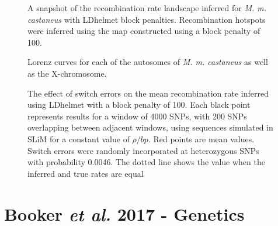  \begin{figure}
   \centering      
   \noindent{}
 \caption[A snapshot of the recombination landscape for genomic region containing the PRDM9 gene]{A snapshot of the recombination rate landscape inferred for \textit{M. m. castaneus} with LDhelmet block penalties. Recombination hotspots were inferred using the map constructed using a block penalty of 100.}
 \label{fig:S4}
\end{figure}
 
 
 \begin{figure}
   \centering      
   \noindent{}
 \caption[Lorenz curves for each of the chromosomes of \textit{M. m. castaneus}]{Lorenz curves for each of the autosomes of \textit{M. m. castaneus} as well as the X-chromosome.}
 \label{fig:S5}
\end{figure}
 
 
 \begin{figure}
   \centering      
   \noindent{}
 \caption[The effect of switch errors on recombination rate inference]{The effect of switch errors on the mean recombination rate inferred using LDhelmet with a block penalty of 100. Each black point represents results for a window of 4000 SNPs, with 200 SNPs overlapping between adjacent windows, using sequences simulated in SLiM for a constant value of $\rho/bp$. Red points are mean values. Switch errors were randomly incorporated at heterozygous SNPs with probability 0.0046. The dotted line shows the value when the inferred and true rates are equal}
 \label{fig:S6}
\end{figure}



\pagebreak
\section{Booker \emph{et al.} 2017 - Genetics}
%
\linespread{2}
